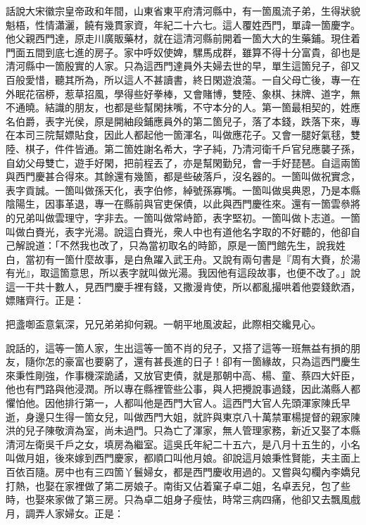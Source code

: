 話說大宋徽宗皇帝政和年間，山東省東平府清河縣中，有一箇風流子弟，生得狀貌魁梧，性情瀟灑，饒有幾貫家資，年紀二十六七。這人覆姓西門，單諱一箇慶字。他父親西門達，原走川廣販藥材，就在這清河縣前開着一箇大大的生藥鋪。現住着門面五間到底七進的房子。家中呼奴使婢，騾馬成群，雖算不得十分富貴，卻也是清河縣中一箇殷實的人家。只為這西門達員外夫婦去世的早，單生這箇兒子，卻又百般愛惜，聽其所為，所以這人不甚讀書，{}終日閑遊浪蕩。一自父母亡後，專一在外眠花宿桺，惹草招風，學得些好拳棒，又會賭博，雙陸、象棋、抹牌、道字，無不通曉。結識的朋友，也都是些幫閑抹嘴，不守本分的人。第一箇最相契的，姓應名伯爵，表字光侯，原是開紬段鋪應員外的第二箇兒子，落了本錢，跌落下來，專在本司三院幫嫖貼食，因此人都起他一箇渾名，叫做應花子。又會一腿好氣毬，雙陸、棋子，件件皆通。{}第二箇姓謝名希大，字子純，乃清河衛千戶官兒應襲子孫，自幼父母雙亡，遊手好閑，把前程丟了，亦是幫閑勤兒，會一手好琵琶。自這兩箇與西門慶甚合得來。其餘還有幾箇，都是些破落戶，沒名器的。一箇叫做祝實念，表字貢誠。一箇叫做孫天化，表字伯修，綽號孫寡嘴。一箇叫做吳典恩，乃是本縣陰陽生，因事革退，專一在縣前與官吏保債，以此與西門慶徃來。還有一箇雲叅將的兄弟叫做雲理守，字非去。一箇叫做常峙節，表字堅初。一箇叫做卜志道。一箇叫做白賚光，表字光湯。說這白賚光，衆人中也有道他名字取的不好聽的，他卻自己解說道：「不然我也改了，只為當初取名的時節，原是一箇門館先生，說我姓白，當初有一箇什麼故事，是白魚躍入武王舟。又說有兩句書是『周有大賚，於湯有光』，取這箇意思，所以表字就叫做光湯。我因他有這段故事，也便不改了。」{}說這一干共十數人，見西門慶手裡有錢，又撒漫肯使，所以都亂撮哄着他耍錢飲酒，嫖賭齊行。正是：

把盞啣盃意氣深，兄兄弟弟抑何親。一朝平地風波起，此際相交纔見心。

說話的，這等一箇人家，生出這等一箇不肖的兒子，又搭了這等一班無益有損的朋友，隨你怎的豪富也要窮了，還有甚長進的日子！卻有一箇緣故，只為這西門慶生來秉性剛強，作事機深詭譎，又放官吏債，就是那朝中高、楊、童、蔡四大奸臣，他也有門路與他浸潤。{}所以專在縣裡管些公事，與人把攪說事過錢，因此滿縣人都懼怕他。因他排行第一，人都叫他是西門大官人。這西門大官人先頭渾家陳氏早逝，身邊只生得一箇女兒，叫做西門大姐，就許與東京八十萬禁軍楊提督的親家陳洪的兒子陳敬濟為室，尚未過門。只為亡了渾家，無人管理家務，新近又娶了本縣清河左衛吳千戶之女，填房為繼室。這吳氏年紀二十五六，是八月十五生的，小名叫做月姐，後來嫁到西門慶家，都順口叫他月娘。卻說這月娘秉性賢能，夫主面上百依百隨。{}房中也有三四箇丫鬟婦女，都是西門慶收用過的。又嘗與勾欄內李嬌兒打熱，也娶在家裡做了第二房娘子。南街又佔着窠子卓二姐，名卓丟兒，包了些時，也娶來家做了第三房。只為卓二姐身子瘦怯，時常三病四痛，他卻又去飄風戲月，調弄人家婦女。正是：

